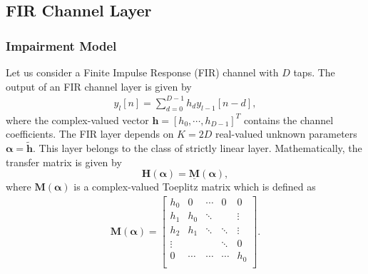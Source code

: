 \documentclass{article}
\begin{document}
\subsection{FIR Channel Layer}

\subsubsection{Impairment Model}
Let us consider a Finite Impulse Response (FIR) channel with $D$ taps. The output of an FIR channel layer is given by 
\begin{align}
y_l[n] = \sum_{d=0}^{D-1} h_d y_{l-1}[n-d],
\end{align}
where the complex-valued vector $\mathbf{h}=[h_0,\cdots,h_{D-1}]^T$ contains the channel coefficients. The FIR layer depends on $K=2D$ real-valued unknown parameters 
$\boldsymbol \alpha=\tilde{\mathbf{h}}$. This layer belongs to the class of strictly linear layer. Mathematically, the transfer matrix is given by
$$
\mathbf{H}(\boldsymbol \alpha)=\underline{\mathbf{M}}(\boldsymbol \alpha),
$$
where $\mathbf{M}(\boldsymbol \alpha)$ is a complex-valued Toeplitz matrix which is defined as
\begin{align}
\mathbf{M}(\boldsymbol  \alpha)=\begin{bmatrix}
h_0 & 0 & \cdots & 0 & 0\\
h_1 & h_0 &  \ddots &  & \vdots\\
h_2 & h_1 &  \ddots &  \ddots & \vdots\\
\vdots &  &  & \ddots & 0\\
0 & \cdots &  \cdots& \cdots & h_0\\
\end{bmatrix}.
\end{align}
\end{document}
